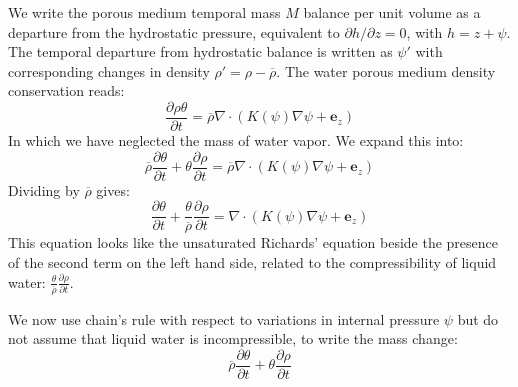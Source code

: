 \documentclass{article}
\begin{document}
We write the porous medium temporal mass $M$ balance per unit volume as a departure from the hydrostatic pressure, equivalent to $\partial h/\partial z=0$, with $h=z+\psi$. The temporal departure from hydrostatic balance is written as $\psi'$ with corresponding changes in density $\rho'=\rho-\overline\rho$. The water porous medium density conservation reads:
\begin{equation}
\frac{\partial \rho \theta}{\partial t} = {\overline{\rho}} \nabla \cdot \left( K(\psi) \nabla \psi + {\mathbf e_z} \right)
\end{equation}
In which we have neglected the mass of water vapor.
We expand this into:
\begin{equation}
{\overline \rho} \frac{\partial \theta}{\partial t} + \theta \frac{\partial \rho}{\partial t} = {\overline \rho} \nabla \cdot \left( K(\psi) \nabla \psi + {\mathbf e_z} \right)
\end{equation}
Dividing by $\overline \rho$ gives:
\begin{equation}
\frac{\partial \theta}{\partial t} + \frac{\theta}{\overline \rho} \frac{\partial \rho}{\partial t} = \nabla \cdot \left( K(\psi) \nabla \psi + {\mathbf e_z} \right)
\end{equation}
This equation looks like the unsaturated Richards’ equation beside the presence of the second term on the left hand side, related to the compressibility of liquid water: $ \frac{\theta}{\overline \rho} \frac{\partial \rho}{\partial t}$.

We now use chain’s rule with respect to variations in internal pressure $\psi$ but do not assume that liquid water is incompressible, to write the mass change:
\begin{equation}
{\overline \rho} \frac{\partial \theta}{\partial t} + \theta \frac{\partial \rho}{\partial t} 
\end{equation}
\end{document}
